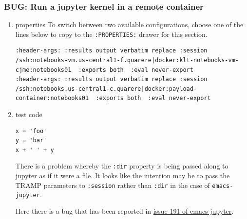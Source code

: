 \documentclass[11pt]{article}
\begin{document}
\subsubsection{BUG: Run a jupyter kernel in a remote container}
\label{sec:org05cbc9d}
\begin{enumerate}
\item properties
\label{sec:org5cb379a}
To switch between two available configurations, choose one of the lines below to copy to the \texttt{:PROPERTIES:} drawer for this section.
\begin{verbatim}
:header-args: :results output verbatim replace :session /ssh:notebooks-vm.us-central1-f.quarere|docker:klt-notebooks-vm-cjme:notebooks01  :exports both  :eval never-export
:header-args: :results output verbatim replace :session /ssh:notebooks.us-central1-c.quarere|docker:payload-container:notebooks01  :exports both  :eval never-export
\end{verbatim}

\item test code
\label{sec:orge9ae6d2}

\begin{verbatim}
x = 'foo'
y = 'bar'
x + ' ' + y
\end{verbatim}

There is a problem whereby the \texttt{:dir} property is being passed along to jupyter as if it were a file. It looks like the intention may be to pass the TRAMP parameters to \texttt{:session} rather than \texttt{:dir} in the case of \texttt{emacs-jupyter}.

Here there is a bug that has been reported in \href{https://github.com/nnicandro/emacs-jupyter/issues/191}{issue 191 of emacs-jupyter}.


\end{enumerate}
\end{document}
